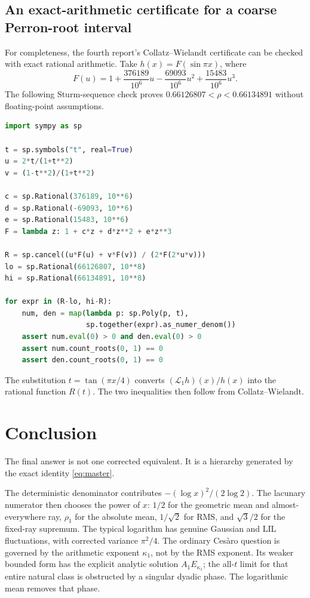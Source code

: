 \documentclass[11pt,oneside]{article}
\theoremstyle{definition}
\theoremstyle{remark}
\newcommand{\Lop}{\mathcal L}
\begin{document}
\subsection{An exact-arithmetic certificate for a coarse Perron-root interval}

For completeness, the fourth report's Collatz--Wielandt certificate can be
checked with exact rational arithmetic.  Take
$h(x)=F(\sin\pi x)$, where
\[
 F(u)=1+\frac{376189}{10^6}u-\frac{69093}{10^6}u^2
      +\frac{15483}{10^6}u^3.
\]
The following Sturm-sequence check proves
$0.66126807<\rho<0.66134891$ without floating-point assumptions.

\begin{lstlisting}[style=code,language=Python]
import sympy as sp

t = sp.symbols("t", real=True)
u = 2*t/(1+t**2)
v = (1-t**2)/(1+t**2)

c = sp.Rational(376189, 10**6)
d = sp.Rational(-69093, 10**6)
e = sp.Rational(15483, 10**6)
F = lambda z: 1 + c*z + d*z**2 + e*z**3

R = sp.cancel((u*F(u) + v*F(v)) / (2*F(2*u*v)))
lo = sp.Rational(66126807, 10**8)
hi = sp.Rational(66134891, 10**8)

for expr in (R-lo, hi-R):
    num, den = map(lambda p: sp.Poly(p, t),
                   sp.together(expr).as_numer_denom())
    assert num.eval(0) > 0 and den.eval(0) > 0
    assert num.count_roots(0, 1) == 0
    assert den.count_roots(0, 1) == 0
\end{lstlisting}
The substitution $t=\tan(\pi x/4)$ converts
$(\Lop_1h)(x)/h(x)$ into the rational function $R(t)$.  The two inequalities
then follow from Collatz--Wielandt.

\section{Conclusion}
\label{sec:conclusion}

The final answer is not one corrected equivalent.  It is a hierarchy generated
by the exact identity \eqref{eq:master}.

The deterministic denominator contributes
$-(\log x)^2/(2\log2)$.  The lacunary numerator then chooses the power of $x$:
$1/2$ for the geometric mean and almost-everywhere ray, $\rho_1$ for the
absolute mean, $1/\sqrt2$ for RMS, and $\sqrt3/2$ for the fixed-ray supremum.
The typical logarithm has genuine Gaussian and LIL fluctuations, with corrected
variance $\pi^2/4$.  The ordinary Ces\`aro question is governed by the
arithmetic exponent $\kappa_1$, not by the RMS exponent.  Its weaker bounded
form has the explicit analytic solution $A_1E_{\kappa_1}$; the all-$t$ limit
for that entire natural class is obstructed by a singular dyadic phase.  The
logarithmic mean removes that phase.
\end{document}
